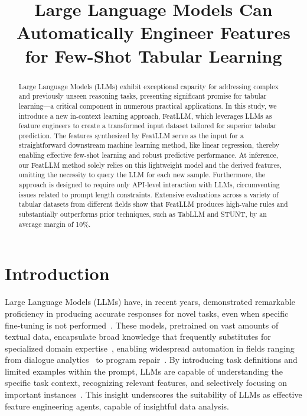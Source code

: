 \title{Large Language Models Can Automatically Engineer Features for Few-Shot Tabular Learning}

\begin{abstract}
Large Language Models (LLMs) exhibit exceptional capacity for addressing complex and previously unseen reasoning tasks, presenting significant promise for tabular learning—a critical component in numerous practical applications. In this study, we introduce a new in-context learning approach, \textsf{FeatLLM}, which leverages LLMs as feature engineers to create a transformed input dataset tailored for superior tabular prediction. The features synthesized by \textsf{FeatLLM} serve as the input for a straightforward downstream machine learning method, like linear regression, thereby enabling effective few-shot learning and robust predictive performance. At inference, our \textsf{FeatLLM} method solely relies on this lightweight model and the derived features, omitting the necessity to query the LLM for each new sample. Furthermore, the approach is designed to require only API-level interaction with LLMs, circumventing issues related to prompt length constraints. Extensive evaluations across a variety of tabular datasets from different fields show that \textsf{FeatLLM} produces high-value rules and substantially outperforms prior techniques, such as TabLLM and STUNT, by an average margin of 10\%.
\end{abstract}

\section{Introduction}
Large Language Models (LLMs) have, in recent years, demonstrated remarkable proficiency in producing accurate responses for novel tasks, even when specific fine-tuning is not performed~\cite{creswell2022selection,imani2023mathprompter,taylor2022galactica}. These models, pretrained on vast amounts of textual data, encapsulate broad knowledge that frequently substitutes for specialized domain expertise~\cite{Genomes2021,singhal2023large,wilcox2003role}, enabling widespread automation in fields ranging from dialogue analytics~\cite{finch2023leveraging} to program repair~\cite{fan2023automated}. By introducing task definitions and limited examples within the prompt, LLMs are capable of understanding the specific task context, recognizing relevant features, and selectively focusing on important instances~\cite{brown2020language,zhao2023survey}. This insight underscores the suitability of LLMs as effective feature engineering agents, capable of insightful data analysis.

